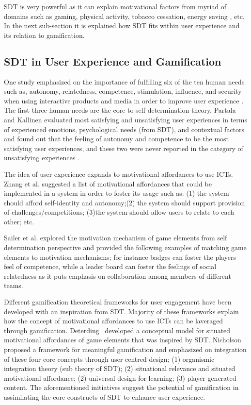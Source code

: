 \documentclass{sig-alternate}
\begin{document}
SDT is very powerful as it can explain motivational factors from myriad of domains such as gaming\cite{ryan2006:motivationalpull}, physical activity\cite{power2011:obesity}, tobacco cessation\cite{williams2006:testing}, energy saving \cite{webb2013:self}, etc. In the next sub-section it is explained how SDT fits within user experience and its relation to gamification.  
\subsection{SDT in User Experience and Gamification}
One study emphasized on the importance of fulfilling six of the ten human needs such as, autonomy, relatedness, competence, stimulation, influence, and security when using interactive products and media in order to improve user experience \cite{wiklund2009:needs}. The first three human needs are the core to self-determination theory. Partala and Kallinen \cite{partala2012:understanding} evaluated most satisfying and unsatisfying user experiences in terms of experienced emotions, psychological needs (from SDT), and contextual factors and found out that the feeling of autonomy and competence to be the most satisfying user experiences, and these two were never reported in the category of unsatisfying experiences \cite{partala2012:understanding}.

The idea of user experience expands to motivational affordances to use ICTs. Zhang et al.\cite{zhang2008:motivational} suggested a list of motivational affordances that could be implemented in a system in order to foster its usage such as: (1) the system should afford self-identity and autonomy;(2) the system should support provision of challenges/competitions; (3)the system should allow users to relate to each other; etc.

Sailer et al.\cite{sailer2013:psychological} explored the motivation mechanism of game elements from self determination perspective and provided the following examples of matching game elements to motivation mechanisms; for instance badges can foster the players feel of competence, while a leader board can foster the feelings of social relatedness as it puts emphasis on collaboration among members of different teams.

Different gamification theoretical frameworks for user engagement have been developed with an inspiration from SDT. Majority of these frameworks explain how the concept of motivational affordances to use ICTs can be laveraged through gamification. Deterding~\cite{deterding2011:situated} developed  a conceptual model for situated motivational affordances of game elements that was inspired by SDT. Nicholson~\cite{nicholson2012:user} proposed a framework for meaningful gamification and emphasized on integration of these four core concepts through user centred design; (1) organismic integration theory (sub theory of SDT); (2) situational relevance and situated motivational affordance; (2) universal design for learning; (3) player generated content. The aforementioned initiatives suggest the potential of gamification in assimilating the core constructs of SDT to enhance user experience.
\end{document}
